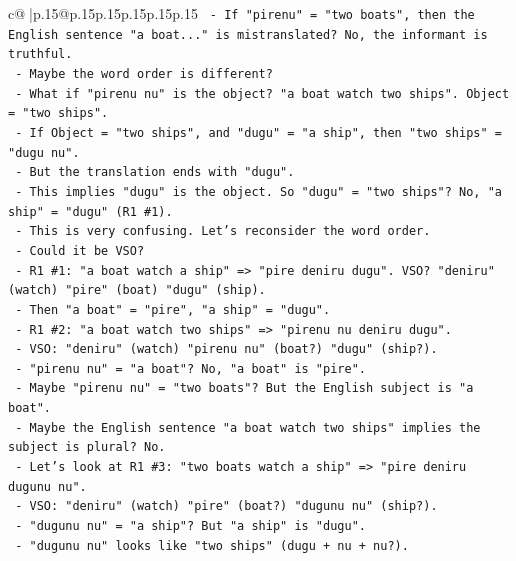 \documentclass{article}
\begin{document}
{\begin{supertabular}{c@{$\;$}|p{.15\linewidth}@{}p{.15\linewidth}p{.15\linewidth}p{.15\linewidth}p{.15\linewidth}p{.15\linewidth}}
{{{\texttt{                {-} If "pirenu" = "two boats", then the English sentence "a boat..." is mistranslated? No, the informant is truthful.} \\
\texttt{                {-} Maybe the word order is different?} \\
\texttt{                {-} What if "pirenu nu" is the object? "a boat watch two ships". Object = "two ships".} \\
\texttt{                {-} If Object = "two ships", and "dugu" = "a ship", then "two ships" = "dugu nu".} \\
\texttt{                {-} But the translation ends with "dugu".} \\
\texttt{                {-} This implies "dugu" is the object. So "dugu" = "two ships"? No, "a ship" = "dugu" (R1 \#1).} \\
\texttt{                {-} This is very confusing. Let's reconsider the word order.} \\
\texttt{                {-} Could it be VSO?} \\
\texttt{                  {-} R1 \#1: "a boat watch a ship" => "pire deniru dugu". VSO? "deniru" (watch) "pire" (boat) "dugu" (ship).} \\
\texttt{                    {-} Then "a boat" = "pire", "a ship" = "dugu".} \\
\texttt{                  {-} R1 \#2: "a boat watch two ships" => "pirenu nu deniru dugu".} \\
\texttt{                    {-} VSO: "deniru" (watch) "pirenu nu" (boat?) "dugu" (ship?).} \\
\texttt{                    {-} "pirenu nu" = "a boat"? No, "a boat" is "pire".} \\
\texttt{                    {-} Maybe "pirenu nu" = "two boats"? But the English subject is "a boat".} \\
\texttt{                    {-} Maybe the English sentence "a boat watch two ships" implies the subject is plural? No.} \\
\texttt{                {-} Let's look at R1 \#3: "two boats watch a ship" => "pire deniru dugunu nu".} \\
\texttt{                  {-} VSO: "deniru" (watch) "pire" (boat?) "dugunu nu" (ship?).} \\
\texttt{                  {-} "dugunu nu" = "a ship"? But "a ship" is "dugu".} \\
\texttt{                  {-} "dugunu nu" looks like "two ships" (dugu + nu + nu?).} \\
}}}
\end{supertabular}}
\end{document}
